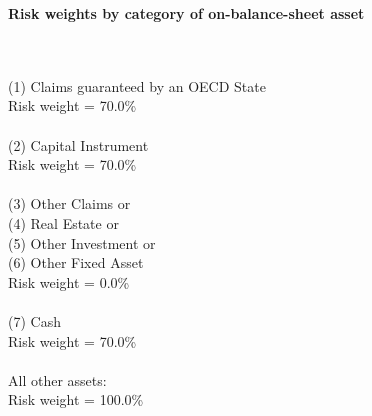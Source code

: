 \documentclass{article}
\begin{document}
\setlength{\parindent}{0em}
\begin{center}{\bf Risk weights by category of on-balance-sheet asset}\end{center}
~\\
~\\

(1) Claims guaranteed by an OECD State \\
Risk weight = 70.0\%\\

~\\
(2) Capital Instrument \\
Risk weight = 70.0\%\\

~\\
(3) Other Claims or \\
(4) Real Estate or \\
(5) Other Investment or \\
(6) Other Fixed Asset \\
Risk weight = 0.0\%\\

~\\
(7) Cash \\
Risk weight = 70.0\%\\

~\\
All other assets:\\
Risk weight = 100.0\%\\

~\\
\end{document}
